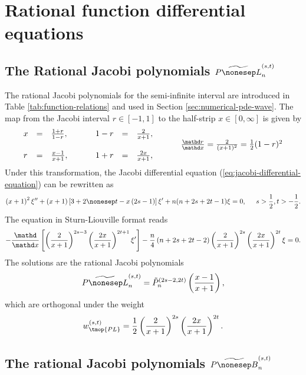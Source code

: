 \section{Rational function differential equations}

\subsection{The Rational Jacobi polynomials $\widetilde{P \nonesep
L}_n^{(s, t)}$}

\label{app:odes-rat-pl}The rational Jacobi polynomials for the semi-infinite
interval are introduced in Table \ref{tab:function-relations} and used in
Section \ref{sec:numerical-pde-wave}. The map from the Jacobi interval $r \in
[- 1, 1]$ to the half-strip $x \in [0, \infty]$ is given by
\[ \begin{array}{lllllllll}
     x & = & \frac{1 + r}{1 - r}, & \hspace{0.5cm}  & 1 - r & = & \frac{2}{x +
     1}, &  & \\
     &  &  &  &  &  &  & \hspace{0.5cm}  & \frac{\mathd r}{\mathd x} =
     \frac{2}{(x + 1)^2} = \frac{1}{2} (1 - r)^2\\
     r & = & \frac{x - 1}{x + 1}, &  & 1 + r & = & \frac{2 x}{x + 1}, &  & 
   \end{array} \]
Under this transformation, the Jacobi differential equation
(\ref{eq:jacobi-differential-equation}) can be rewritten as
\[ \left( x + 1 \right)^2 \xi'' + (x + 1) \left[ 3 + 2 \nonesep t - x \left(
   2 s - 1 \right) \right] \xi' + n (n + 2 s + 2 t - 1) \xi = 0,
   \hspace{0.5cm} s > \frac{1}{2}, t > - \frac{1}{2} . \]
The equation in Sturn-Liouville format reads
\[ - \frac{\mathd}{\mathd x} \left[ \left( \frac{2}{x + 1} \right)^{2 s - 3}
   \left( \frac{2 x}{x + 1} \right)^{2 t + 1} \xi' \right] - \frac{n}{4}
   \left( n + 2 s + 2 t - 2 \right) \left( \frac{2}{x + 1} \right)^{2 s}
   \left( \frac{2 x}{x + 1} \right)^{2 t} \xi = 0. \]
The solutions are the rational Jacobi polynomials
\[ \widetilde{P \nonesep L}^{(s, t)}_n = \tilde{P}_n^{(2 s - 2, 2 t)} \left(
   \frac{x - 1}{x + 1} \right), \]
which are orthogonal under the weight
\[ w_{\tmop{PL}}^{(s, t)} = \frac{1}{2} \left( \frac{2}{x + 1} \right)^{2 s}
   \left( \frac{2 x}{x + 1} \right)^{2 t} . \]


\subsection{The rational Jacobi polynomials $\widetilde{P \nonesep
B}_n^{(s, t)}$}


